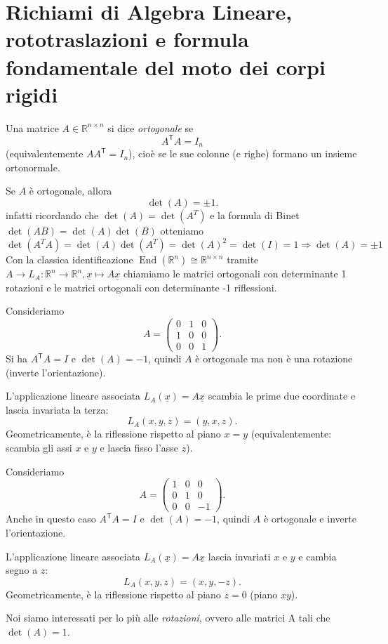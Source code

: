 \chapter{Richiami di Algebra Lineare, rototraslazioni e formula fondamentale del moto dei corpi rigidi}
\begin{definition}{}
Una matrice $A\in\mathbb{R}^{n\times n}$ si dice \emph{ortogonale} se
\[
A^{\mathsf T}A=I_n
\]
(equivalentemente $AA^{\mathsf T}=I_n$), cioè se le sue colonne (e righe) formano un insieme ortonormale.
\end{definition}

\begin{oss}{}
Se $A$ è ortogonale, allora
\[
\det(A)=\pm 1.
\]
infatti ricordando che $\det(A) = \det(A^T)$ e la formula di Binet $\det(AB) = \det(A) \det(B)$ otteniamo
\[
\det(A^T A) = \det(A) \det(A^T) = \det(A)^2 = \det(I) = 1 \Rightarrow \det(A) = \pm 1
\]
Con la classica identificazione $\operatorname{End}(\mathbb{R}^n) \cong \mathbb{R}^{n \times n }$ tramite $A \to L_A: \mathbb{R}^n \to \mathbb{R}^n , \underline{x} \mapsto A\underline{x}$ chiamiamo le matrici ortogonali con determinante 1 rotazioni e le matrici ortogonali con determinante -1 riflessioni.
\end{oss}

\begin{example}{}
Consideriamo
\[
A=
\begin{pmatrix}
0 & 1 & 0\\
1 & 0 & 0\\
0 & 0 & 1
\end{pmatrix}.
\]
Si ha $A^{\mathsf T}A=I$ e $\det(A)=-1$, quindi $A$ è ortogonale ma non è una rotazione (inverte l'orientazione).

L'applicazione lineare associata $L_A(\underline{x})=A\underline{x}$ scambia le prime due coordinate e lascia invariata la terza:
\[
L_A(x,y,z)=(y,x,z).
\]
Geometricamente, è la riflessione rispetto al piano $x=y$ (equivalentemente: scambia gli assi $x$ e $y$ e lascia fisso l'asse $z$).
\end{example}

\begin{example}{}
Consideriamo
\[
A=
\begin{pmatrix}
1 & 0 & 0\\
0 & 1 & 0\\
0 & 0 & -1
\end{pmatrix}.
\]
Anche in questo caso $A^{\mathsf T}A=I$ e $\det(A)=-1$, quindi $A$ è ortogonale e inverte l'orientazione.

L'applicazione lineare associata $L_A(\underline{x})=A\underline{x}$ lascia invariati $x$ e $y$ e cambia segno a $z$:
\[
L_A(x,y,z)=(x,y,-z).
\]
Geometricamente, è la riflessione rispetto al piano $z=0$ (piano $xy$).
\end{example}
Noi siamo interessati per lo più alle \emph{rotazioni}, ovvero alle matrici A tali che $\det(A) = 1$.

